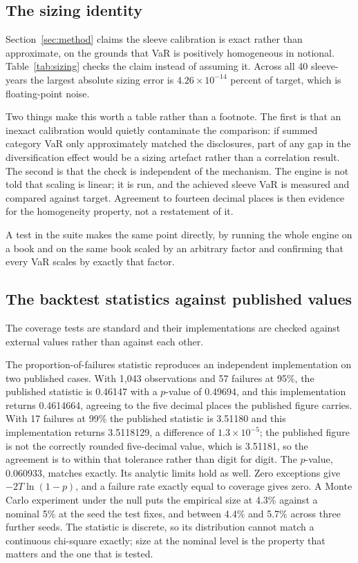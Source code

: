 \subsection{The sizing identity}

Section~\ref{sec:method} claims the sleeve calibration is exact rather than
approximate, on the grounds that VaR is positively homogeneous in notional.
Table~\ref{tab:sizing} checks the claim instead of assuming it. Across all 40
sleeve-years the largest absolute sizing error is
$4.26 \times 10^{-14}$ percent of target, which is floating-point noise.



Two things make this worth a table rather than a footnote. The first is that an
inexact calibration would quietly contaminate the comparison: if summed
category VaR only approximately matched the disclosures, part of any gap in the
diversification effect would be a sizing artefact rather than a correlation
result. The second is that the check is independent of the mechanism. The
engine is not told that scaling is linear; it is run, and the achieved sleeve
VaR is measured and compared against target. Agreement to fourteen decimal
places is then evidence for the homogeneity property, not a restatement of it.

A test in the suite makes the same point directly, by running the whole engine
on a book and on the same book scaled by an arbitrary factor and confirming
that every VaR scales by exactly that factor.

\subsection{The backtest statistics against published values}

The coverage tests are standard and their implementations are checked against
external values rather than against each other.

The \citet{kupiec1995} proportion-of-failures statistic reproduces an
independent implementation on two published cases. With 1{,}043 observations and
57 failures at 95\%, the published statistic is 0.46147 with a $p$-value of
0.49694, and this implementation returns 0.4614664, agreeing to the five decimal
places the published figure carries. With 17 failures at 99\% the published
statistic is 3.51180 and this implementation returns 3.5118129, a difference of
$1.3 \times 10^{-5}$; the published figure is not the correctly rounded
five-decimal value, which is 3.51181, so the agreement is to within that
tolerance rather than digit for digit. The $p$-value, 0.060933, matches
exactly. Its analytic limits hold as well. Zero exceptions give
$-2T\ln(1-p)$, and a failure rate exactly equal to coverage gives zero. A
Monte Carlo experiment under the null puts the empirical size at 4.3\% against
a nominal 5\% at the seed the test fixes, and between 4.4\% and 5.7\% across
three further seeds. The statistic is discrete, so its distribution cannot
match a continuous chi-square exactly; size at the nominal level is the
property that matters and the one that is tested.

